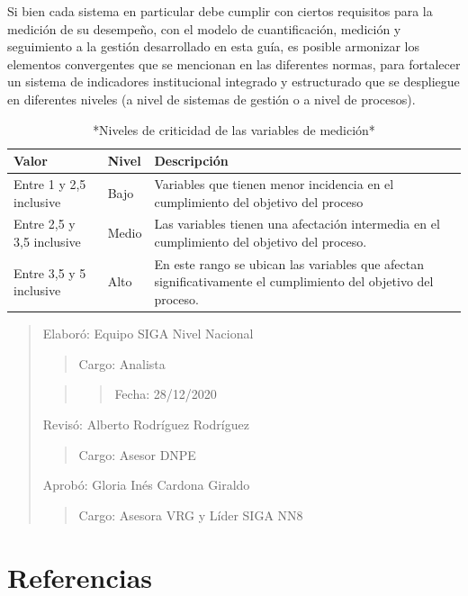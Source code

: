 \documentclass[
]{book}
\begin{document}
Si bien cada sistema en particular debe cumplir con ciertos requisitos para la medición de su desempeño, con el modelo de cuantificación, medición y seguimiento a la gestión desarrollado en esta guía, es posible armonizar los elementos convergentes que se mencionan en las diferentes normas, para fortalecer un sistema de indicadores institucional integrado y estructurado que se despliegue en diferentes niveles (a nivel de sistemas de gestión o a nivel de procesos).

\begin{table}

\caption{\label{tab:tablaE}*Niveles de criticidad de las variables de medición*}
\centering
\begin{tabular}[t]{l|l|l}
\hline
Valor & Nivel & Descripción\\
\hline
Entre 1 y 2,5 inclusive & Bajo & Variables que tienen menor incidencia en el cumplimiento del objetivo del proceso\\
\hline
Entre 2,5 y 3,5 inclusive & Medio & Las variables tienen una afectación intermedia en el cumplimiento del objetivo del proceso.\\
\hline
Entre 3,5 y 5 inclusive & Alto & En este rango se ubican las variables que afectan significativamente el cumplimiento del objetivo del proceso.\\
\hline
\end{tabular}
\end{table}

\begin{quote}
Elaboró: Equipo SIGA Nivel Nacional

\begin{quote}
Cargo: Analista
\end{quote}

\begin{quote}
\begin{quote}
Fecha: 28/12/2020
\end{quote}
\end{quote}

Revisó: Alberto Rodríguez Rodríguez

\begin{quote}
Cargo: Asesor DNPE
\end{quote}

Aprobó: Gloria Inés Cardona Giraldo

\begin{quote}
Cargo: Asesora VRG y Líder SIGA NN8
\end{quote}
\end{quote}

\hypertarget{referencias}{%
\chapter*{Referencias}\label{referencias}}

  
\end{document}
